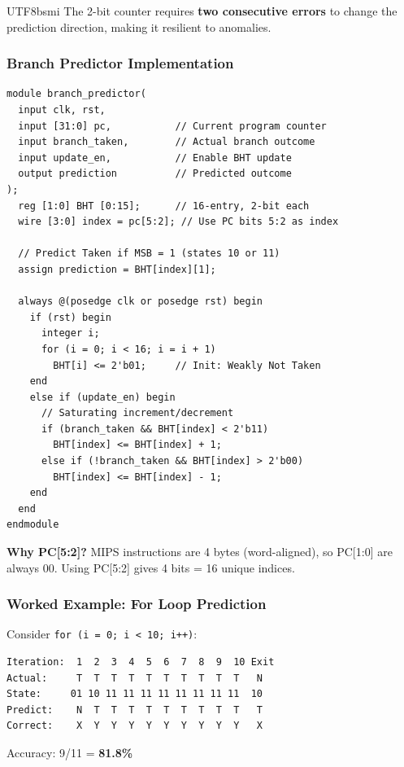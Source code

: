 \documentclass[journal,twoside]{IEEEtran}
\begin{document}
\begin{CJK}{UTF8}{bsmi}
The 2-bit counter requires \textbf{two consecutive errors} to change the prediction direction, making it resilient to anomalies.

\subsubsection{Branch Predictor Implementation}
\begin{lstlisting}
module branch_predictor(
  input clk, rst,
  input [31:0] pc,           // Current program counter
  input branch_taken,        // Actual branch outcome
  input update_en,           // Enable BHT update
  output prediction          // Predicted outcome
);
  reg [1:0] BHT [0:15];      // 16-entry, 2-bit each
  wire [3:0] index = pc[5:2]; // Use PC bits 5:2 as index
  
  // Predict Taken if MSB = 1 (states 10 or 11)
  assign prediction = BHT[index][1];
  
  always @(posedge clk or posedge rst) begin
    if (rst) begin
      integer i;
      for (i = 0; i < 16; i = i + 1)
        BHT[i] <= 2'b01;     // Init: Weakly Not Taken
    end
    else if (update_en) begin
      // Saturating increment/decrement
      if (branch_taken && BHT[index] < 2'b11)
        BHT[index] <= BHT[index] + 1;
      else if (!branch_taken && BHT[index] > 2'b00)
        BHT[index] <= BHT[index] - 1;
    end
  end
endmodule
\end{lstlisting}

\textbf{Why PC[5:2]?} MIPS instructions are 4 bytes (word-aligned), so PC[1:0] are always 00. Using PC[5:2] gives 4 bits = 16 unique indices.

\subsubsection{Worked Example: For Loop Prediction}
Consider \texttt{for (i = 0; i < 10; i++)}:
\begin{lstlisting}
Iteration:  1  2  3  4  5  6  7  8  9  10 Exit
Actual:     T  T  T  T  T  T  T  T  T  T   N
State:     01 10 11 11 11 11 11 11 11 11  10
Predict:    N  T  T  T  T  T  T  T  T  T   T
Correct:    X  Y  Y  Y  Y  Y  Y  Y  Y  Y   X
\end{lstlisting}
Accuracy: 9/11 = \textbf{81.8\%}


\end{CJK}
\end{document}
